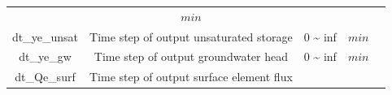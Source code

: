 \documentclass[]{scrbook}
\begin{document}
\begin{longtable}[]{@{}ccccc@{}}
\begin{minipage}[t]{0.10\columnwidth}
\end{minipage} & \begin{minipage}[t]{0.10\columnwidth}\centering\strut
\(min\)\strut
\end{minipage} & \begin{minipage}[t]{0.26\columnwidth}\centering\strut
\strut
\end{minipage}\tabularnewline
\begin{minipage}[t]{0.17\columnwidth}\centering\strut
dt\_ye\_unsat\strut
\end{minipage} & \begin{minipage}[t]{0.23\columnwidth}\centering\strut
Time step of output unsaturated storage\strut
\end{minipage} & \begin{minipage}[t]{0.10\columnwidth}\centering\strut
0 \textasciitilde{} inf\strut
\end{minipage} & \begin{minipage}[t]{0.10\columnwidth}\centering\strut
\(min\)\strut
\end{minipage} & \begin{minipage}[t]{0.26\columnwidth}\centering\strut
\strut
\end{minipage}\tabularnewline
\begin{minipage}[t]{0.17\columnwidth}\centering\strut
dt\_ye\_gw\strut
\end{minipage} & \begin{minipage}[t]{0.23\columnwidth}\centering\strut
Time step of output groundwater head\strut
\end{minipage} & \begin{minipage}[t]{0.10\columnwidth}\centering\strut
0 \textasciitilde{} inf\strut
\end{minipage} & \begin{minipage}[t]{0.10\columnwidth}\centering\strut
\(min\)\strut
\end{minipage} & \begin{minipage}[t]{0.26\columnwidth}\centering\strut
\strut
\end{minipage}\tabularnewline
\begin{minipage}[t]{0.17\columnwidth}\centering\strut
dt\_Qe\_surf\strut
\end{minipage} & \begin{minipage}[t]{0.23\columnwidth}\centering\strut
Time step of output surface element flux\strut
\end{minipage} & \begin{minipage}[t]{0.10\columnwidth}\centering\strut

\end{minipage}
\end{longtable}
\end{document}
